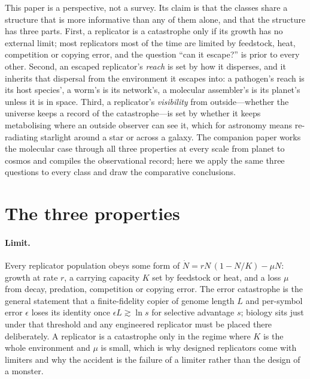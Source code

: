 \documentclass[11pt]{article}
\begin{document}
This paper is a perspective, not a survey.  Its claim is that the classes
share a structure that is more informative than any of them alone, and that
the structure has three parts.  First, a replicator is a catastrophe only if
its growth has no external limit; most replicators most of the time are
limited by feedstock, heat, competition or copying error, and the question
``can it escape?'' is prior to every other.  Second, an escaped replicator's
\emph{reach} is set by how it disperses, and it inherits that dispersal from
the environment it escapes into: a pathogen's reach is its host species', a
worm's is its network's, a molecular assembler's is its planet's unless it is
in space.  Third, a replicator's \emph{visibility} from outside---whether the
universe keeps a record of the catastrophe---is set by whether it keeps
metabolising where an outside observer can see it, which for astronomy means
re-radiating starlight around a star or across a galaxy.  The companion paper
\citep{GooPaper} works the molecular case through all three properties at
every scale from planet to cosmos and compiles the observational record; here
we apply the same three questions to every class and draw the comparative
conclusions.

\section{The three properties}

\paragraph{Limit.}  Every replicator population obeys some form of
$\dot N = rN\,(1 - N/K) - \mu N$: growth at rate $r$, a carrying capacity $K$
set by feedstock or heat, and a loss $\mu$ from decay, predation, competition
or copying error.  The error catastrophe \citep{Eigen1971} is the general
statement that a finite-fidelity copier of genome length $L$ and per-symbol
error $\epsilon$ loses its identity once $\epsilon L\gtrsim\ln s$ for
selective advantage $s$; biology sits just under that threshold and any
engineered replicator must be placed there deliberately.  A replicator is a
catastrophe only in the regime where $K$ is the whole environment and $\mu$ is
small, which is why designed replicators come with limiters
\citep{Ellery2022b} and why the accident is the failure of a limiter rather
than the design of a monster.
\end{document}
